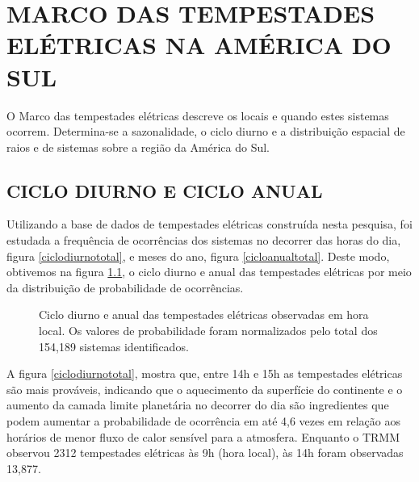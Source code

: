 \chapter{MARCO DAS TEMPESTADES ELÉTRICAS NA AMÉRICA DO SUL}

O Marco das tempestades elétricas descreve os locais e quando estes sistemas ocorrem. Determina-se a sazonalidade, o ciclo diurno e a distribuição espacial de raios e de sistemas sobre a região da América do Sul. 


\section{CICLO DIURNO E CICLO ANUAL}

Utilizando a base de dados de tempestades elétricas construída nesta pesquisa, foi estudada a frequência de ocorrências dos sistemas no decorrer das horas do dia, figura \ref{ciclodiurnototal}, e meses do ano, figura \ref{cicloanualtotal}. Deste modo, obtivemos na figura \ref{diurnoanual}, o ciclo diurno e anual das tempestades elétricas por meio da distribuição de probabilidade de ocorrências.

\begin{figure}[!hb]
\caption{Ciclo diurno e anual das tempestades elétricas observadas em hora local. Os valores de probabilidade foram normalizados pelo total dos 154,189 sistemas identificados.}
\label{diurnoanual} 
\end{figure} 

A figura \ref{ciclodiurnototal},  mostra que, entre 14h e 15h as tempestades elétricas são mais prováveis, indicando que o aquecimento da superfície do continente e o aumento da camada limite planetária no decorrer do dia são ingredientes que podem aumentar a probabilidade de ocorrência em até 4,6 vezes em relação aos horários de menor fluxo de calor sensível para a atmosfera. Enquanto o TRMM observou 2312 tempestades elétricas às 9h (hora local), às 14h foram observadas 13,877.

